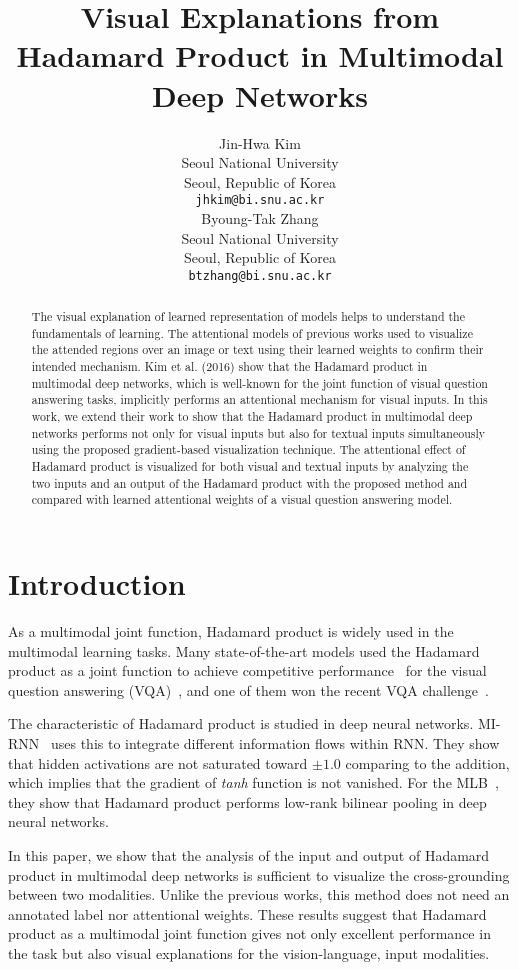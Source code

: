 \documentclass{article}
\title{Visual Explanations from Hadamard Product in Multimodal Deep Networks}
\author{
  Jin-Hwa Kim \\
  Seoul National University\\
  Seoul, Republic of Korea \\
  \texttt{jhkim@bi.snu.ac.kr} \\
  \And
  Byoung-Tak Zhang \\
  Seoul National University\\
  Seoul, Republic of Korea \\
  \texttt{btzhang@bi.snu.ac.kr} \\
}
\begin{document}
\maketitle

\begin{abstract}
The visual explanation of learned representation of models helps to understand the fundamentals of learning.
The attentional models of previous works used to visualize the attended regions over an image or text using their learned weights to confirm their intended mechanism.
Kim et al. (2016) show that the Hadamard product in multimodal deep networks, which is well-known for the joint function of visual question answering tasks, implicitly performs an attentional mechanism for visual inputs.
In this work, we extend their work to show that the Hadamard product in multimodal deep networks performs not only for visual inputs but also for textual inputs simultaneously using the proposed gradient-based visualization technique.
The attentional effect of Hadamard product is visualized for both visual and textual inputs by analyzing the two inputs and an output of the Hadamard product with the proposed method and compared with learned attentional weights of a visual question answering model.
\end{abstract}

\section{Introduction}

As a multimodal joint function, Hadamard product is widely used in the multimodal learning tasks. Many state-of-the-art models used the Hadamard product as a joint function to achieve competitive performance~\cite{Kim2016b,Kim2017,Nam2016,Teney2017} for the visual question answering (VQA)~\cite{agrawal2017vqa}, and one of them won the recent VQA challenge~\cite{Teney2017}. 

The characteristic of Hadamard product is studied in deep neural networks. MI-RNN~\cite{Wu2016a} uses this to integrate different information flows within RNN. They show that hidden activations are not saturated toward $\pm1.0$ comparing to the addition, which implies that the gradient of \textit{tanh} function is not vanished. For the MLB~\cite{Kim2017}, they show that Hadamard product performs low-rank bilinear pooling in deep neural networks.

In this paper, we show that the analysis of the input and output of Hadamard product in multimodal deep networks is sufficient to visualize the cross-grounding between two modalities. Unlike the previous works, this method does not need an annotated label nor attentional weights. These results suggest that Hadamard product as a multimodal joint function gives not only excellent performance in the task but also visual explanations for the vision-language, input modalities.
\end{document}
